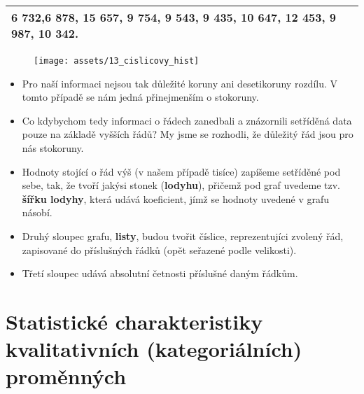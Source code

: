 \begin{itemize}
\begin{itemize}
\begin{table}[H]
\begin{tabular}{|l|}
                            6 732,6 878, 15 657, 9 754, 9 543, 9 435, 10 647, 12 453, 9 987, 10 342.  \\ \hline
                        \end{tabular}
                    \end{table}
                    \begin{figure}[H]
                        \centering
                        \texttt{[image: assets/13\_cislicovy\_hist]}
                    \end{figure}
                    \begin{itemize}
                        \item Pro naší informaci nejsou tak důležité koruny ani desetikoruny rozdílu. V tomto případě se nám jedná přinejmenším o stokoruny.
                        \item Co kdybychom tedy informaci o  řádech zanedbali a znázornili setříděná data pouze na základě vyšších řádů? My jsme se rozhodli, že důležitý řád jsou pro nás stokoruny.
                        \item Hodnoty stojící o řád výš (v našem případě tisíce) zapíšeme setříděné pod sebe, tak, že tvoří jakýsi stonek (\textbf{lodyhu}), přičemž pod graf uvedeme tzv. \textbf{šířku lodyhy}, která udává koeficient, jímž se hodnoty uvedené v grafu násobí.
                        \item Druhý sloupec grafu, \textbf{listy}, budou tvořit číslice, reprezentujíci zvolený  řád, zapisované do příslušných řádků (opět seřazené podle velikosti).
                        \item Třetí sloupec udává absolutní četnosti příslušné daným řádkům.
                    \end{itemize}
          \end{itemize}
\end{itemize}

\section{Statistické charakteristiky kvalitativních (kategoriálních) proměnných}

